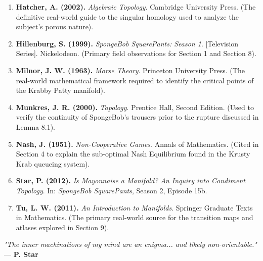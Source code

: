 \documentclass[12pt]{article}
\begin{document}
\begin{enumerate}
    \item \textbf{Hatcher, A. (2002).} \textit{Algebraic Topology}. Cambridge University Press. (The definitive real-world guide to the singular homology used to analyze the subject’s porous nature).
    
    \item \textbf{Hillenburg, S. (1999).} \textit{SpongeBob SquarePants: Season 1}. [Television Series]. Nickelodeon. (Primary field observations for Section 1 and Section 8).
    
    \item \textbf{Milnor, J. W. (1963).} \textit{Morse Theory}. Princeton University Press. (The real-world mathematical framework required to identify the critical points of the Krabby Patty manifold).
    
    \item \textbf{Munkres, J. R. (2000).} \textit{Topology}. Prentice Hall, Second Edition. (Used to verify the continuity of SpongeBob's trousers prior to the rupture discussed in Lemma 8.1).
    
    \item \textbf{Nash, J. (1951).} \textit{Non-Cooperative Games}. Annals of Mathematics. (Cited in Section 4 to explain the sub-optimal Nash Equilibrium found in the Krusty Krab queueing system).
    
    \item \textbf{Star, P. (2012).} \textit{Is Mayonnaise a Manifold? An Inquiry into Condiment Topology}. In: \textit{SpongeBob SquarePants}, Season 2, Episode 15b.
    
    \item \textbf{Tu, L. W. (2011).} \textit{An Introduction to Manifolds}. Springer Graduate Texts in Mathematics. (The primary real-world source for the transition maps and atlases explored in Section 9).
\end{enumerate}

\vfill

\begin{center}
    \textit{"The inner machinations of my mind are an enigma... and likely non-orientable."} \\
    --- \textbf{P. Star}
\end{center}
\end{document}
